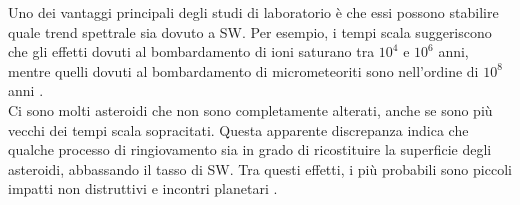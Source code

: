 \documentclass[a4paper,11pt,openright]{book}
\begin{document}

Uno dei vantaggi principali degli studi di laboratorio è che essi possono stabilire quale trend spettrale sia dovuto a SW. 
Per esempio, i tempi scala suggeriscono che gli effetti dovuti al bombardamento di ioni saturano tra $10^4$ e $10^6$ anni, mentre quelli dovuti al bombardamento di micrometeoriti sono nell'ordine di $10^8$ anni \citep{loeffler_irradiation_2009, brunetto_space_2006}.\\
Ci sono molti asteroidi che non sono completamente alterati, anche se sono più vecchi dei tempi scala sopracitati. Questa apparente discrepanza indica che qualche processo di ringiovamento sia in grado di ricostituire la superficie degli asteroidi, abbassando il tasso di SW. Tra questi effetti, i più probabili sono piccoli impatti non distruttivi e incontri planetari \citep{shestopalov_optical_2013}.
\end{document}
